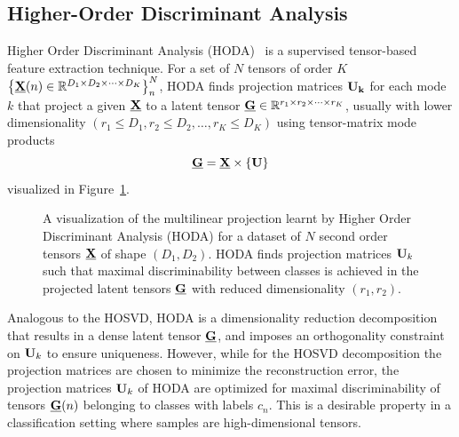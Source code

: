 \documentclass[twocolumn]{article}
\begin{document}
\subsection{Higher-Order Discriminant Analysis}
Higher Order Discriminant Analysis (\textsc{HODA})~\cite{Phan2010} is a
supervised tensor-based
feature extraction technique.
For a set of $N$ tensors of order $K$
$\left\{\underline{\mathbf{X}}(n)\in\mathbb{R}^{D_1\times D_2 \times \cdots \times
		D_K}\right\}_n^N$, \textsc{HODA} finds projection matrices $\mathbf{U_k}$ for each mode $k$
that project a given $\underline{\mathbf{X}}$ to a latent tensor
$\underline{\mathbf{G}}\in\mathbb{R}^{r_1\times r_2\times\cdots\times r_K}$, usually with lower
dimensionality $(r_1\leq D_1,r_2\leq D_2,\ldots,r_K\leq D_K)$ using
tensor-matrix mode products
\begin{equation}
	\underline{\mathbf{G}}  = \underline{\mathbf{X}}\times\left\{\mathbf{U}\right\}
	\label{eq:HODA-backward}
\end{equation}
visualized in Figure~\ref{fig:HODA-backward}.
\begin{figure}[t]
	\centering
	
	\caption{A visualization of the multilinear projection learnt by Higher Order
		Discriminant Analysis (\textsc{HODA}) for a dataset of $N$ second order tensors
		$\underline{\mathbf{X}}$ of shape $(D_1,D_2)$.
		\textsc{HODA} finds projection matrices $\mathbf{U}_k$ such that maximal
		discriminability between classes is achieved in the projected latent tensors
		$\underline{\mathbf{G}}$ with reduced dimensionality $(r_1,r_2)$.}
	\label{fig:HODA-backward}
\end{figure}
Analogous to the \textsc{HOSVD}, \textsc{HODA} is a dimensionality
reduction decomposition that results in a dense latent tensor $\underline{\mathbf{G}}$, and
imposes an orthogonality constraint on $\mathbf{U}_k$ to ensure uniqueness.
However, while for the \textsc{HOSVD} decomposition the projection matrices
are chosen to minimize the reconstruction error, the projection matrices
$\mathbf{U}_k$ of \textsc{HODA} are optimized for maximal discriminability of tensors
$\underline{\mathbf{G}}(n)$ belonging to classes with labels $c_n$.
This is a desirable property in a classification setting where samples are
high-dimensional tensors.
\end{document}
